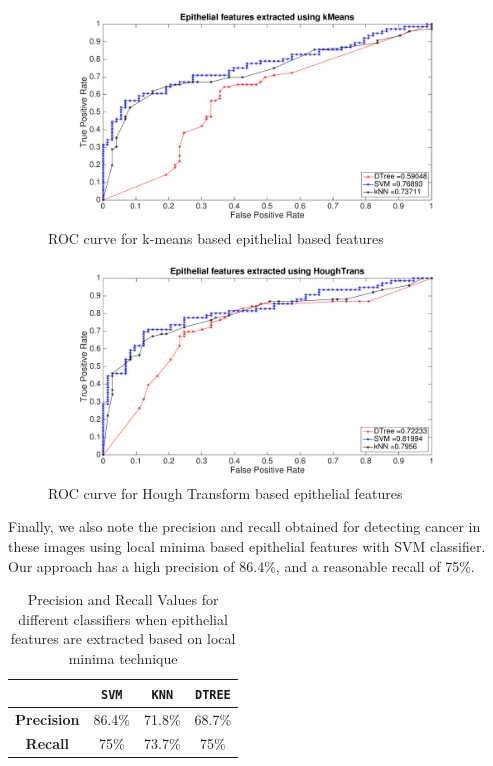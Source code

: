 \begin{figure}[!htb]
\includegraphics[scale=0.2]{figs/ROC_kMeans.pdf}
\caption{\label{fig:ROC_kMeans}ROC curve for k-means based epithelial based features}
\end{figure}


\begin{figure}[!htb]
\includegraphics[scale=0.2]{figs/ROC_circleConv.pdf}
\caption{\label{fig:ROC_circleConv}ROC curve for Hough Transform based  epithelial features}
\end{figure} 



Finally, we also note the precision and recall obtained for detecting cancer in these images using local minima based epithelial features with SVM classifier. Our approach has a high  precision of 86.4\%, and a reasonable recall of 75\%.

\begin{table}
\centering
\begin{tabular}{|c|c|c|c| }
\hline
 & \textbf{\texttt{SVM}} & \textbf{\texttt{KNN}} & \textbf{\texttt{DTREE}} \\ \hline
\textbf{Precision} & 86.4\% & 71.8\% & 68.7\% \\ \hline
\textbf{Recall} & 75\% & 73.7\%  & 75\% \\ \hline
\end{tabular}
\caption{\label{table:PrecisionRecall}Precision and Recall Values for different classifiers when epithelial features are extracted based on local minima technique}
\end{table}